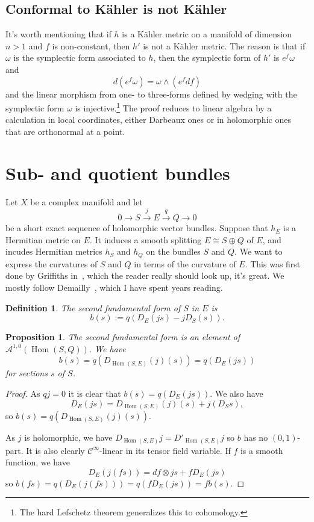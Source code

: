 \documentclass[10pt,a4paper]{article}
\newtheorem{prop}[theo]{Proposition}
\newtheorem{defi}[theo]{Definition}
\newtheorem*{proof}{Proof}
\newcommand{\cc}[1]{\mathcal{#1}}
\DeclareMathOperator{\Hom}{Hom}
\begin{document}
\subsection{Conformal to K\"ahler is not K\"ahler}
\label{sec:org7b1cfdf}

It's worth mentioning that if \(h\) is a K\"ahler metric on a manifold of dimension \(n > 1\) and \(f\) is non-constant, then \(h'\) is not a K\"ahler metric. The reason is that if \(\omega\) is the symplectic form associated to \(h\), then the symplectic form of \(h'\) is \(e^f \omega\) and
$$
d(e^f \omega) = \omega \wedge (e^f df)
$$
and the linear morphism from one- to three-forms defined by wedging with the symplectic form \(\omega\) is injective.\footnote{The hard Lefschetz theorem generalizes this to cohomology.}
The proof reduces to linear algebra by a calculation in local coordinates, either Darbeaux ones or in holomorphic ones that are orthonormal at a point.


\section{Sub- and quotient bundles}
\label{sec:sub-quotient}

Let $X$ be a complex manifold and let
\[
0 \longrightarrow
S \stackrel{j}{\longrightarrow}
E \stackrel{q}{\longrightarrow}
Q \longrightarrow
0
\]
be a short exact sequence of holomorphic vector bundles. Suppose that $h_E$ is a Hermitian metric on $E$. It induces a smooth splitting $E \cong S \oplus Q$ of $E$, and incudes Hermitian metrics $h_S$ and $h_Q$ on the bundles $S$ and $Q$. We want to express the curvatures of $S$ and $Q$ in terms of the curvature of $E$. This was first done by Griffiths in~\cite{griffiths1965hermitian}, which the reader really should look up, it's great. We mostly follow Demailly~\cite[Chapter~5.14]{demailly-complex}, which I have spent years reading.


\begin{defi}
The \emph{second fundamental form} of $S$ in $E$ is
\[
b(s) := q(D_E(js) - jD_S(s)).
\]
\end{defi}

\begin{prop}
\label{prop:second-fundamental-form}
The second fundamental form is an element of $\cc A^{1,0}(\Hom(S,Q))$.
We have
\[
b(s)
= q(D_{\Hom(S,E)}(j)(s))
= q(D_E(js))
\]
for sections $s$ of $S$.
\end{prop}

\begin{proof}
As $qj = 0$ it is clear that $b(s) = q(D_E(js))$. We also have
\[
D_E(js) = D_{\Hom(S,E)}(j)(s) + j(D_Ss),
\]
so $b(s) = q(D_{\Hom(S,E)}(j)(s))$.

As $j$ is holomorphic, we have $D_{\Hom(S,E)}j = D'_{\Hom(S,E)}j$ so $b$ has no $(0,1)$-part. It is also clearly $\cc C^\infty$-linear in its tensor field variable. If $f$ is a smooth function, we have
\[
D_E(j(fs))
= df \otimes js + f D_E(js)
\]
so $b(fs) = q(D_E(j(fs))) = q(f D_E(js)) = fb(s)$.
\end{proof}
\end{document}

